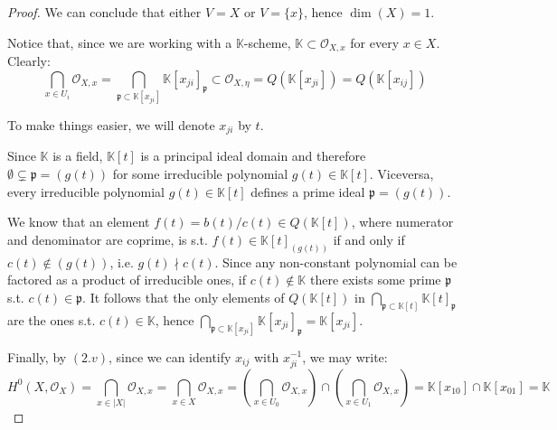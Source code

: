 \documentclass{article}
\newcommand{\numberset}{\mathbb}
\newcommand{\K}{\numberset{K}}
\newcommand{\pid}{\mathfrak{p}}
\begin{document}
\begin{proof}
    We can conclude that either $V=X$ or $V=\{x\}$, hence $\dim(X)=1$.

    Notice that, since we are working with a $\K$-scheme,
    $\K\subset\mathcal{O}_{X,x}$ for every $x\in X$. Clearly:
    $$
        \bigcap_{x\in U_i}\mathcal{O}_{X,x}=
        \bigcap_{\pid\subset\K[x_{ji}]}\K[x_{ji}]_\pid
        \subset\mathcal{O}_{X,\eta}=Q(\K[x_{ji}])= Q(\K[x_{ij}])
    $$

    To make things easier, we will denote $x_{ji}$ by $t$.

    Since $\K$ is a field, $\K[t]$ is a principal ideal domain and therefore
    $\emptyset\subsetneq\pid=(g(t))$ for some irreducible polynomial
    $g(t)\in\K[t]$. Viceversa, every irreducible polynomial $g(t)\in\K[t]$
    defines a prime ideal $\pid=(g(t))$.

    We know that an element $f(t)=b(t)/c(t)\in Q(\K[t])$, where numerator and
    denominator are coprime, is s.t. $f(t)\in\K[t]_{(g(t))}$ if and only if
    $c(t)\not\in (g(t))$, i.e. $g(t)\nmid c(t)$. Since any non-constant
    polynomial can be factored as a product of irreducible ones, if
    $c(t)\not\in\K$ there exists
    some prime $\pid$ s.t. $c(t)\in\pid$. It follows that the only elements of
    $Q(\K[t])$ in $\bigcap_{\pid\subset\K[t]}\K[t]_\pid$ are the ones s.t.
    $c(t)\in\K$, hence $\bigcap_{\pid\subset\K[x_{ji}]}\K[x_{ji}]_\pid=
    \K[x_{ji}]$.

    Finally, by $(2.v)$, since we can identify $x_{ij}$ with $x_{ji}^{-1}$, we
    may write:
    $$
    H^0(X,\mathcal{O}_X)=\bigcap_{x\in |X|}\mathcal{O}_{X,x}
    =\bigcap_{x\in X}\mathcal{O}_{X,x}
    =\left(\bigcap_{x\in U_0}\mathcal{O}_{X,x}\right)\cap
    \left(\bigcap_{x\in U_1}\mathcal{O}_{X,x}\right)
    =\K[x_{10}]\cap\K[x_{01}]
    =\K
    $$
\end{proof}

\printbibliography
\end{document}
